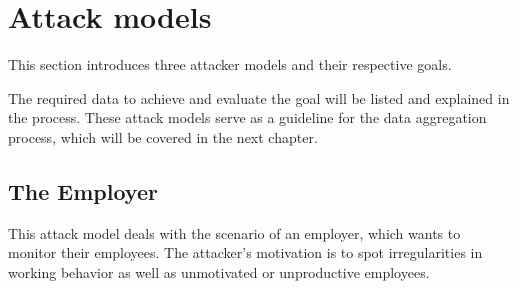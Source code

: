 \section{Attack models}\label{attack-models}
This section introduces three attacker models and their respective goals.

The required data to achieve and evaluate the goal will be listed and explained in the process.
These attack models serve as a guideline for the data aggregation process, which will be covered in the next chapter.

\subsection{The Employer}\label{employer-monitoring}
This attack model deals with the scenario of an employer, which wants to monitor their employees.
The attacker's motivation is to spot irregularities in working behavior as well as unmotivated or unproductive employees.

